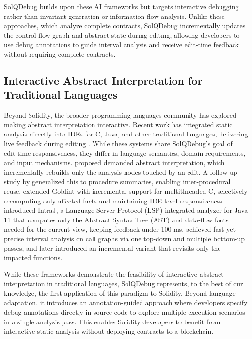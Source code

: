 \documentclass[pdflatex,sn-basic]{sn-jnl}%
\theoremstyle{thmstyleone}%
\theoremstyle{thmstyletwo}%
\theoremstyle{thmstylethree}%
\begin{document}
        SolQDebug builds upon these AI frameworks but targets interactive debugging
        rather than invariant generation or information flow analysis. Unlike these approaches, which analyze complete contracts, SolQDebug incrementally updates
        the control-flow graph and abstract state during editing, allowing developers to use debug annotations
        to guide interval analysis and receive edit-time feedback without requiring complete contracts.
    
    \subsection{Interactive Abstract Interpretation for Traditional Languages}
        Beyond Solidity, the broader programming languages community has explored
        making abstract interpretation interactive. Recent work has integrated static analysis
        directly into IDEs for C, Java, and other traditional languages, delivering live feedback
        during editing \citep{daig, ds, iac, iaj, fap}. While these systems share SolQDebug's
        goal of edit-time responsiveness, they differ in language semantics, domain requirements,
        and input mechanisms.
        \citet{daig} proposed demanded abstract interpretation, which incrementally rebuilds only
        the analysis nodes touched by an edit.
        A follow-up study by \citet{ds} generalized this to procedure summaries, enabling inter-procedural
        reuse.
        \citet{iac} extended Goblint with incremental support for multithreaded C, selectively
        recomputing only affected facts and maintaining IDE-level responsiveness.
        \citet{iaj} introduced IntraJ, a Language Server Protocol (LSP)-integrated analyzer for Java 11 that computes only the
        Abstract Syntax Tree (AST) and data-flow facts needed for the current view, keeping feedback under 100 ms.
        \citet{fap} achieved fast yet precise interval analysis on call graphs via one top-down and
        multiple bottom-up passes, and later introduced an incremental variant that revisits only
        the impacted functions.

        While these frameworks demonstrate the feasibility of interactive abstract interpretation
        in traditional languages, SolQDebug represents, to the best of our knowledge, the first application of this paradigm
        to Solidity. Beyond language adaptation, it introduces an annotation-guided approach where developers
        specify debug annotations directly in source code to explore multiple execution scenarios in a single analysis pass. This enables Solidity developers to benefit from interactive static analysis without deploying contracts to a blockchain.
\end{document}
